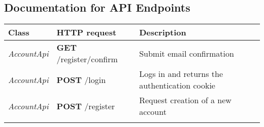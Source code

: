\hypertarget{documentation-for-api-endpoints}{%
\subsection{Documentation for API
Endpoints}\label{documentation-for-api-endpoints}}

\begin{longtable}[]{@{}lll@{}}
\toprule
\begin{minipage}[b]{0.29\columnwidth}\raggedright
Class\strut
\end{minipage} & \begin{minipage}[b]{0.31\columnwidth}\raggedright
HTTP request\strut
\end{minipage} & \begin{minipage}[b]{0.31\columnwidth}\raggedright
Description\strut
\end{minipage}\tabularnewline
\midrule
\endhead
\begin{minipage}[t]{0.29\columnwidth}\raggedright
\emph{AccountApi}\strut
\end{minipage} & \begin{minipage}[t]{0.31\columnwidth}\raggedright
\textbf{GET} /register/confirm\strut
\end{minipage} & \begin{minipage}[t]{0.31\columnwidth}\raggedright
Submit email confirmation\strut
\end{minipage}\tabularnewline
\begin{minipage}[t]{0.29\columnwidth}\raggedright
\emph{AccountApi}\strut
\end{minipage} & \begin{minipage}[t]{0.31\columnwidth}\raggedright
\textbf{POST} /login\strut
\end{minipage} & \begin{minipage}[t]{0.31\columnwidth}\raggedright
Logs in and returns the authentication cookie\strut
\end{minipage}\tabularnewline
\begin{minipage}[t]{0.29\columnwidth}\raggedright
\emph{AccountApi}\strut
\end{minipage} & \begin{minipage}[t]{0.31\columnwidth}\raggedright
\textbf{POST} /register\strut
\end{minipage} & \begin{minipage}[t]{0.31\columnwidth}\raggedright
Request creation of a new account\strut
\end{minipage}\tabularnewline
\begin{minipage}[t]{0.29\columnwidth}\raggedright

\end{minipage}
\end{longtable}
